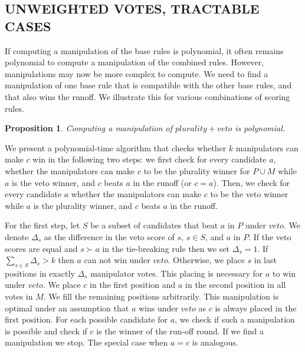 \documentclass{ecai2012}
\newcommand{\winner}[2]{\mbox{$#1 + #2$}}
\newtheorem{proposition}{Proposition}
\newcommand{\myproof}{\vspace{-3mm}\noindent {\bf Proof:\ \ }}
\newcommand\lirong[1]{}
\begin{document}
\subsection*{UNWEIGHTED VOTES, TRACTABLE CASES}
\vspace{-1mm}
If computing a manipulation of the base rules
is polynomial, it often remains polynomial to
compute a manipulation of the combined rules. However,
manipulations may now be more complex to compute.
We need to find a manipulation of one base rule
that is compatible with the other base rules, and
that also wins the runoff.
We illustrate this for various combinations of scoring rules.

\begin{proposition}
Computing a manipulation of $\winner{plurality}{veto}$
is polynomial.
\end{proposition}
\myproof\lirong{Added an overview of proof.}  We present a polynomial-time algorithm that checks whether $k$ manipulators can make $c$ win in the following two steps: we first check for every candidate $a$, whether the manipulators can make $c$ to be the plurality winner for $P\cup M$ while $a$ is the veto winner, and $c$ beats $a$ in the runoff (or $c=a$). Then, we check for every candidate $a$ whether the manipulators can make $c$ to be the veto winner while $a$ is the plurality winner, and $c$ beats $a$ in the runoff.

For the first step, let $S$ be a subset of candidates that beat $a$ in $P$
under $veto$.
We denote $\Delta_{s}$ as the difference
in the veto score of $s$, $s\in S$, and $a$ in $P$.
If the veto scores are equal and $s\succ a$
in the tie-breaking rule then we set $\Delta_{s} = 1$.
If $\sum_{s \in S} \Delta_{s} > k$ then $a$ can not win under $veto$.
Otherwise, we  place $s$ in
last positions in exactly $\Delta_{s}$ manipulator votes.
This placing is necessary for $a$ to win under $veto$.
We place $c$ in the first position and $a$ in the second position
in all votes in $M$. We fill the remaining positions arbitrarily.
This manipulation is optimal under an assumption
that $a$ wins under $veto$ as $c$ is always placed in the first position.
For each possible candidate for $a$, we check
if such a manipulation is possible and check if $c$ is the winner of
the run-off round. If we find a manipulation we stop.
The special case when $a=c$ is analogous.
\end{document}

